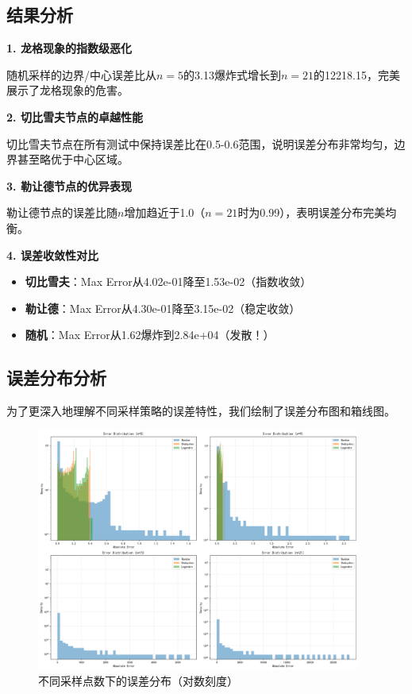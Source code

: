 \documentclass[a4paper,12pt]{article}
\theoremstyle{definition}
\begin{document}
\subsection{结果分析}

\begin{tcolorbox}[enhanced,colback=blue!5!white,colframe=barcolor,title=关键发现]

\textbf{1. 龙格现象的指数级恶化}

随机采样的边界/中心误差比从$n=5$的3.13爆炸式增长到$n=21$的12218.15，完美展示了龙格现象的危害。

\textbf{2. 切比雪夫节点的卓越性能}

切比雪夫节点在所有测试中保持误差比在0.5-0.6范围，说明误差分布非常均匀，边界甚至略优于中心区域。

\textbf{3. 勒让德节点的优异表现}

勒让德节点的误差比随$n$增加趋近于1.0（$n=21$时为0.99），表明误差分布完美均衡。

\textbf{4. 误差收敛性对比}

\begin{itemize}
    \item \textbf{切比雪夫}：Max Error从4.02e-01降至1.53e-02（指数收敛）
    \item \textbf{勒让德}：Max Error从4.30e-01降至3.15e-02（稳定收敛）
    \item \textbf{随机}：Max Error从1.62爆炸到2.84e+04（发散！）
\end{itemize}

\end{tcolorbox}

\subsection{误差分布分析}

为了更深入地理解不同采样策略的误差特性，我们绘制了误差分布图和箱线图。

\begin{figure}[H]
\centering
\includegraphics[width=0.95\textwidth]{results/task1/additional/error_distribution.png}
\caption{不同采样点数下的误差分布（对数刻度）}
\label{fig:task1_error_dist}
\end{figure}
\end{document}
